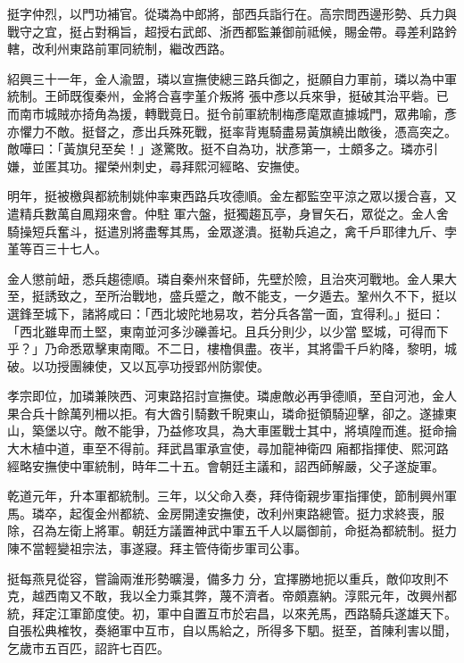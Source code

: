\begin{pinyinscope}
 挺字仲烈，以門功補官。從璘為中郎將，部西兵詣行在。高宗問西邊形勢、兵力與戰守之宜，挺占對稱旨，超授右武郎、浙西都監兼御前祗候，賜金帶。尋差利路鈐轄，改利州東路前軍同統制，繼改西路。



 紹興三十一年，金人渝盟，璘以宣撫使總三路兵御之，挺願自力軍前，璘以為中軍統制。王師既復秦州，金將合喜孛堇介叛將
 張中彥以兵來爭，挺破其治平砦。已而南市城賊亦掎角為援，轉戰竟日。挺令前軍統制梅彥麾眾直據城門，眾弗喻，彥亦懼力不敵。挺督之，彥出兵殊死戰，挺率背嵬騎盡易黃旗繞出敵後，憑高突之。敵嘩曰：「黃旗兒至矣！」遂驚敗。挺不自為功，狀彥第一，士頗多之。璘亦引嫌，並匿其功。擢榮州刺史，尋拜熙河經略、安撫使。



 明年，挺被檄與都統制姚仲率東西路兵攻德順。金左都監空平涼之眾以援合喜，又遣精兵數萬自鳳翔來會。仲駐
 軍六盤，挺獨趨瓦亭，身冒矢石，眾從之。金人舍騎操短兵奮斗，挺遣別將盡奪其馬，金眾遂潰。挺勒兵追之，禽千戶耶律九斤、孛堇等百三十七人。



 金人懲前衄，悉兵趨德順。璘自秦州來督師，先壁於險，且治夾河戰地。金人果大至，挺誘致之，至所治戰地，盛兵蹙之，敵不能支，一夕遁去。鞏州久不下，挺以選鋒至城下，諸將咸曰：「西北坡陀地易攻，若分兵各當一面，宜得利。」挺曰：「西北雖卑而土堅，東南並河多沙礫善圮。且兵分則少，以少當
 堅城，可得而下乎？」乃命悉眾擊東南陬。不二日，樓櫓俱盡。夜半，其將雷千戶約降，黎明，城破。以功授團練使，又以瓦亭功授郢州防禦使。



 孝宗即位，加璘兼陜西、河東路招討宣撫使。璘慮敵必再爭德順，至自河池，金人果合兵十餘萬列柵以拒。有大酋引騎數千睨東山，璘命挺領騎迎擊，卻之。遂據東山，築堡以守。敵不能爭，乃益修攻具，為大車匿戰士其中，將填隍而進。挺命掄大木植中道，車至不得前。拜武昌軍承宣使，尋加龍神衛四
 廂都指揮使、熙河路經略安撫使中軍統制，時年二十五。會朝廷主議和，詔西師解嚴，父子遂旋軍。



 乾道元年，升本軍都統制。三年，以父命入奏，拜侍衛親步軍指揮使，節制興州軍馬。璘卒，起復金州都統、金房開達安撫使，改利州東路總管。挺力求終喪，服除，召為左衛上將軍。朝廷方議置神武中軍五千人以屬御前，命挺為都統制。挺力陳不當輕變祖宗法，事遂寢。拜主管侍衛步軍司公事。



 挺每燕見從容，嘗論兩淮形勢曠漫，備多力
 分，宜擇勝地扼以重兵，敵仰攻則不克，越西南又不敢，我以全力乘其弊，蔑不濟者。帝頗嘉納。淳熙元年，改興州都統，拜定江軍節度使。初，軍中自置互市於宕昌，以來羌馬，西路騎兵遂雄天下。自張松典榷牧，奏絕軍中互市，自以馬給之，所得多下駟。挺至，首陳利害以聞，乞歲市五百匹，詔許七百匹。




\end{pinyinscope}
